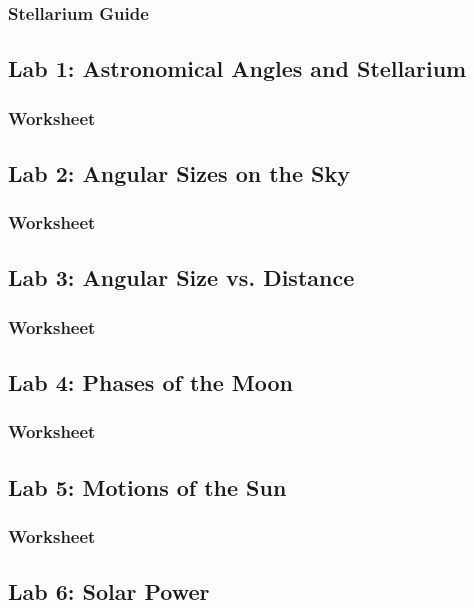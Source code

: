 \documentclass[12pt]{article}
\begin{document}
\subsubsection{Stellarium Guide}


\subsection{Lab 1: Astronomical Angles and Stellarium}
\subsubsection{Worksheet}


\subsection{Lab 2: Angular Sizes on the Sky}
\subsubsection{Worksheet}
%

\subsection{Lab 3: Angular Size vs. Distance}
\subsubsection{Worksheet}


\subsection{Lab 4: Phases of the Moon}
\subsubsection{Worksheet}


\subsection{Lab 5: Motions of the Sun}
\subsubsection{Worksheet}


\subsection{Lab 6: Solar Power}
\end{document}
